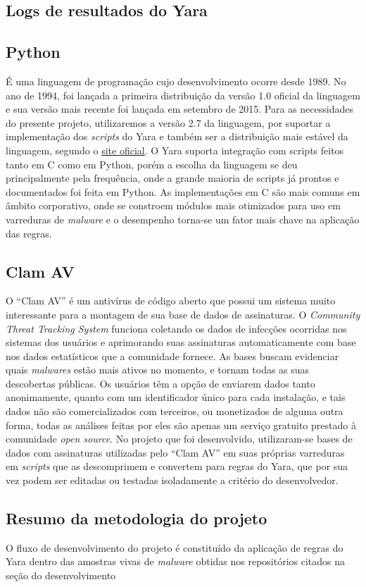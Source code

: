 \subsection{Logs de resultados do Yara} %
\label{sub:logs_de_resultados_do_yara}

\subsection{Python}
\label{sub:python}

É uma linguagem de programação cujo desenvolvimento ocorre desde 1989. No ano
de 1994, foi lançada a primeira distribuição da versão 1.0 oficial da
linguagem e sua versão mais recente foi lançada em setembro de 2015. Para as
necessidades do presente projeto, utilizaremos a versão 2.7 da linguagem, por
suportar a implementação dos \textit{scripts} do Yara e também ser a distribuição mais
estável da linguagem, segundo o \href{www.python.org}{site oficial}. O Yara suporta integração com scripts feitos tanto em C como em Python, porém a escolha da linguagem se deu principalmente pela frequência, onde a grande maioria de scripts já prontos e documentados foi feita em Python. As implementações em C são mais comuns em âmbito corporativo, onde se constroem módulos mais otimizados para uso em varreduras de \textit{malware} e o desempenho torna-se um fator mais chave na aplicação das regras.

\subsection{Clam AV}
\label{sub:clamav}

O ``Clam AV'' é um antivírus de código aberto que possui um sistema muito interessante para a montagem de sua base de dados de assinaturas. O \textit{Community Threat Tracking System} funciona coletando os dados de infecções ocorridas nos sistemas dos usuários e aprimorando suas assinaturas automaticamente com base nos dados estatísticos que a comunidade fornece. As bases buscam evidenciar quais \textit{malwares} estão mais ativos no momento, e tornam todas as suas descobertas públicas. Os usuários têm a opção de enviarem dados tanto anonimamente, quanto com um identificador único para cada instalação, e tais dados não são comercializados com terceiros, ou monetizados de alguma outra forma, todas as análises feitas por eles são apenas um serviço gratuito prestado à comunidade \textit{open source}.
No projeto que foi desenvolvido, utilizaram-se bases de dados com assinaturas utilizadas pelo ``Clam AV'' em suas próprias varreduras em \textit{scripts} que as descomprimem e convertem para regras do Yara, que por sua vez podem ser editadas ou testadas isoladamente a critério do desenvolvedor.


\subsection{Resumo da metodologia do projeto}
\label{ss.resumo}

O fluxo de desenvolvimento do projeto é constituído da aplicação de regras do Yara dentro das amostras vivas de \textit{malware} obtidas nos repositórios citados na seção do desenvolvimento